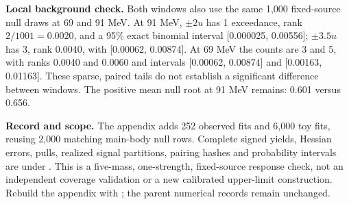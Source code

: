 \documentclass[11pt]{article}
\begin{document}
\textbf{Local background check.} Both windows also use the same 1,000 fixed-source null draws at 69 and 91 MeV. At 91 MeV, $\pm2u$ has 1 exceedance, rank $2/1001=0.0020$, and a 95\% exact binomial interval [0.000025, 0.00556]; $\pm3.5u$ has 3, rank 0.0040, with [0.00062, 0.00874]. At 69 MeV the counts are 3 and 5, with ranks 0.0040 and 0.0060 and intervals [0.00062, 0.00874] and [0.00163, 0.01163]. These sparse, paired tails do not establish a significant difference between windows. The positive mean null root at 91 MeV remains: 0.601 versus 0.656.

\textbf{Record and scope.} The appendix adds 252 observed fits and 6,000 toy fits, reusing 2,000 matching main-body null rows. Complete signed yields, Hessian errors, pulls, realized signal partitions, pairing hashes and probability intervals are under . This is a five-mass, one-strength, fixed-source response check, not an independent coverage validation or a new calibrated upper-limit construction. Rebuild the appendix with ; the parent numerical records remain unchanged.
\end{document}
